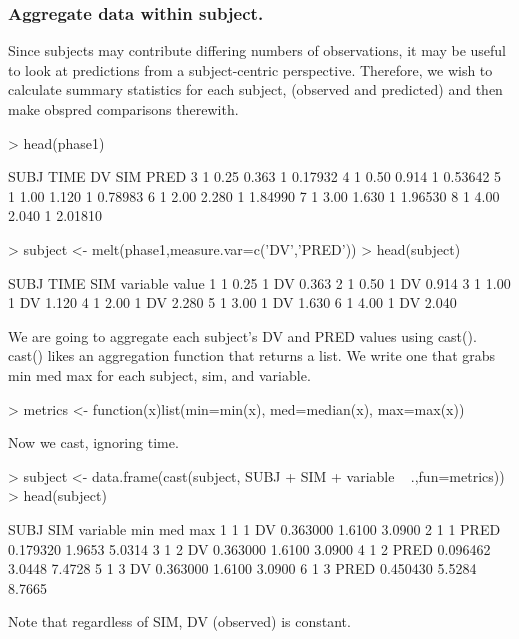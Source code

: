 \subsubsection{Aggregate data within subject.}
Since subjects may contribute differing numbers of observations, it may
be useful to look at predictions from a subject-centric perspective.
Therefore, we wish to calculate summary statistics for each subject, 
(observed and predicted) and then make obspred comparisons therewith.
\begin{Schunk}
\begin{Sinput}
> head(phase1)
\end{Sinput}
\begin{Soutput}
  SUBJ TIME    DV SIM    PRED
3    1 0.25 0.363   1 0.17932
4    1 0.50 0.914   1 0.53642
5    1 1.00 1.120   1 0.78983
6    1 2.00 2.280   1 1.84990
7    1 3.00 1.630   1 1.96530
8    1 4.00 2.040   1 2.01810
\end{Soutput}
\begin{Sinput}
> subject <- melt(phase1,measure.var=c('DV','PRED'))
> head(subject)
\end{Sinput}
\begin{Soutput}
  SUBJ TIME SIM variable value
1    1 0.25   1       DV 0.363
2    1 0.50   1       DV 0.914
3    1 1.00   1       DV 1.120
4    1 2.00   1       DV 2.280
5    1 3.00   1       DV 1.630
6    1 4.00   1       DV 2.040
\end{Soutput}
\end{Schunk}
We are going to aggregate each subject's DV and PRED values using cast().
cast() likes an aggregation function that returns a list.
We write one that grabs min med max for each subject, sim, and variable.
\begin{Schunk}
\begin{Sinput}
> metrics <- function(x)list(min=min(x), med=median(x), max=max(x))
\end{Sinput}
\end{Schunk}
Now we cast, ignoring time.
\begin{Schunk}
\begin{Sinput}
> subject <- data.frame(cast(subject, SUBJ + SIM + variable ~ .,fun=metrics))
> head(subject)
\end{Sinput}
\begin{Soutput}
  SUBJ SIM variable      min    med    max
1    1   1       DV 0.363000 1.6100 3.0900
2    1   1     PRED 0.179320 1.9653 5.0314
3    1   2       DV 0.363000 1.6100 3.0900
4    1   2     PRED 0.096462 3.0448 7.4728
5    1   3       DV 0.363000 1.6100 3.0900
6    1   3     PRED 0.450430 5.5284 8.7665
\end{Soutput}
\end{Schunk}
Note that regardless of SIM, DV (observed) is constant.

